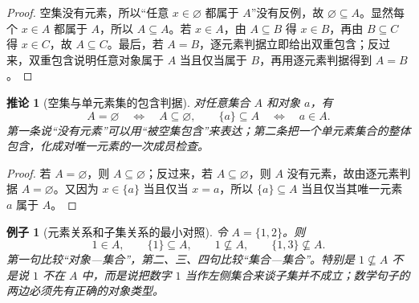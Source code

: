 \documentclass[UTF8,fontset=none,a4paper,11pt]{ctexart}
\theoremstyle{foundation-definition}
\theoremstyle{foundation-theorem}
\theoremstyle{foundation-proposition}
\theoremstyle{foundation-example}
\newtheorem{example}[definition]{例子}
\theoremstyle{foundation-remark}
\theoremstyle{foundation-theorem}
\newtheorem{corollary}[definition]{推论}
\begin{document}
\begin{proof}
空集没有元素，所以“任意 \(x\in\varnothing\) 都属于 \(A\)”没有反例，故 \(\varnothing\subseteq A\)。显然每个 \(x\in A\) 都属于 \(A\)，所以 \(A\subseteq A\)。若 \(x\in A\)，由 \(A\subseteq B\) 得 \(x\in B\)，再由 \(B\subseteq C\) 得 \(x\in C\)，故 \(A\subseteq C\)。最后，若 \(A=B\)，逐元素判据立即给出双重包含；反过来，双重包含说明任意对象属于 \(A\) 当且仅当属于 \(B\)，再用逐元素判据得到 \(A=B\)。
\end{proof}

\begin{corollary}[空集与单元素集的包含判据]\label{cor:empty-singleton-subset}
对任意集合 \(A\) 和对象 \(a\)，有
\[
A=\varnothing\quad\Longleftrightarrow\quad A\subseteq\varnothing,
\qquad
\{a\}\subseteq A\quad\Longleftrightarrow\quad a\in A.
\]
第一条说“没有元素”可以用“被空集包含”来表达；第二条把一个单元素集合的整体包含，化成对唯一元素的一次成员检查。
\end{corollary}

\begin{proof}
若 \(A=\varnothing\)，则 \(A\subseteq\varnothing\)；反过来，若 \(A\subseteq\varnothing\)，则 \(A\) 没有元素，故由逐元素判据 \(A=\varnothing\)。又因为 \(x\in\{a\}\) 当且仅当 \(x=a\)，所以 \(\{a\}\subseteq A\) 当且仅当其唯一元素 \(a\) 属于 \(A\)。
\end{proof}

\begin{example}[元素关系和子集关系的最小对照]
令 \(A=\{1,2\}\)。则
\[
1\in A,\qquad \{1\}\subseteq A,\qquad 1\not\subseteq A,
\qquad \{1,3\}\not\subseteq A.
\]
第一句比较“对象—集合”，第二、三、四句比较“集合—集合”。特别是 \(1\not\subseteq A\) 不是说 \(1\) 不在 \(A\) 中，而是说把数字 \(1\) 当作左侧集合来谈子集并不成立；数学句子的两边必须先有正确的对象类型。
\end{example}
\end{document}
